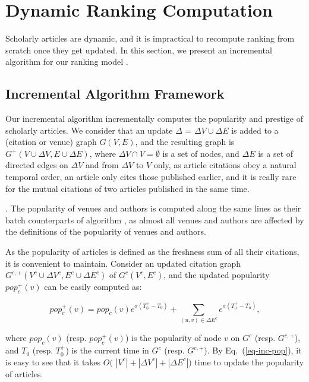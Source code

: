 \section{Dynamic Ranking Computation}
\label{sec-incAlg}

Scholarly articles are dynamic, and it is impractical to recompute ranking from scratch once they get updated. In this section, we present an incremental algorithm for our ranking model \ensemblerank.


\subsection{Incremental Algorithm Framework}
\label{subsec-inc-alg}




Our incremental algorithm \incensemble incrementally computes the popularity and prestige of scholarly articles.
We consider that an update $\Delta$ = $\Delta V\cup\Delta E$ is added to a   (citation or venue) graph $G(V, E)$,
and the resulting graph is $G^+(V\cup\Delta V, E\cup\Delta E)$, where
$\Delta V\cap V = \emptyset$ is a set of nodes, and $\Delta E$ is a set of directed edges on $\Delta V$ and from $\Delta V$ to $V$ only, as article citations obey a natural temporal order, \ie an article only cites those published earlier, and it is really rare for the mutual citations of two articles published in the same time.


.
The popularity of venues and authors is computed along the same lines as their batch counterparts of algorithm \batensemble,
as almost all venues and authors are affected  by the definitions of the popularity of venues and authors.


As the popularity of articles is defined as the freshness sum of all their citations, it is convenient to maintain. Consider an updated citation graph $G^{c,+}(V^c\cup\Delta V^c, E^c\cup\Delta E^c)$ of $G^c(V^c, E^c)$, and the updated popularity $pop_{c}^+(v)$ can be easily computed as:
\begin{small}
\begin{equation}\label{eq-inc-pop}
pop_c^+(v) = pop_c(v) {e^{\sigma (T^+_0-T_0)}} + \sum_{(u,v)\in \Delta E^c} {e^{\sigma (T^+_0-T_u)}},
\end{equation}
\end{small}
\noindent
where $pop_c(v)$ (resp. $pop_c^+(v)$) is the popularity of node $v$ on $G^c$ (resp. $G^{c,+}$), and
 $T_0$ (resp. $T^+_0$) is the current time in $G^c$ (resp. $G^{c,+}$).
%
By Eq.~(\ref{eq-inc-pop}), it is easy to see that it takes $O($ $|V^c|+|\Delta V^c|+|\Delta E^c|)$ time to update the popularity of articles.



